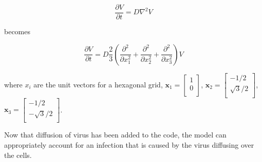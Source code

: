 \documentclass[a4paper]{article}
\begin{document}
$$\frac{\partial V}{\partial t} = D\nabla^{2}V$$

\noindent
becomes 

$$\frac{\partial V}{\partial t} = D\frac{2}{3} \left (\frac{\partial^2}{\partial x^2_1}+\frac{\partial^2}{\partial x^2_2}+\frac{\partial^2}{\partial x^2_3}\right )V$$ 

\noindent
where $x_i$ are the unit vectors for a hexagonal grid, 
$\textbf{x}_1=
\left [
    \begin{array}{c}
        1 \\
        0 \\
    \end{array}
\right ]$, 
$\textbf{x}_2=
\left [
    \begin{array}{c}
        -1/2 \\
        \sqrt{3}/2 \\
    \end{array}
\right ]$, 
$\textbf{x}_3=
\left [
    \begin{array}{c}
        -1/2 \\
        -\sqrt{3}/2 \\
    \end{array}
\right ]$.

\noindent
Now that diffusion of virus has been added to the code, the model can appropriately account for an infection that is caused by the virus diffusing over the cells.
\\
\end{document}

